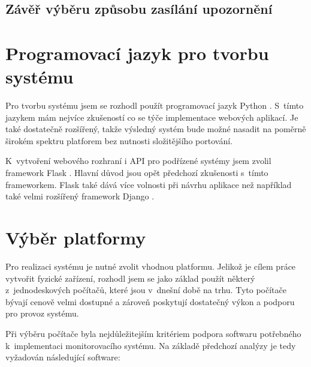 

\subsection{Závěř výběru způsobu zasílání upozornění}




\section{Programovací jazyk pro tvorbu systému}
\label{sec:an_lang}

Pro tvorbu systému jsem se rozhodl použít programovací jazyk Python \cite{python_tutorial}. S~tímto jazykem mám nejvíce zkušeností co se týče implementace webových aplikací. Je také dostatečně rozšířený, takže výsledný systém bude možné nasadit na poměrně širokém spektru platforem bez nutnosti složitějšího portování.

K~vytvoření webového rozhraní i API pro podřízené systémy jsem zvolil framework Flask \cite{flask_about}. Hlavní důvod jsou opět předchozí zkušenosti s~tímto frameworkem. Flask také dává více volnosti při návrhu aplikace než například také velmi rozšířený framework Django \cite{django_about}.

\section{Výběr platformy}
\label{sec:an_plat}

Pro realizaci systému je nutné zvolit vhodnou platformu. Jelikož je cílem práce vytvořit fyzické zařízení, rozhodl jsem se jako základ použít některý z~jednodeskových počítačů, které jsou v~dnešní době na trhu. Tyto počítače bývají cenově velmi dostupné a zároveň poskytují dostatečný výkon a podporu pro provoz systému.

Při výběru počítače byla nejdůležitejším kritériem podpora softwaru potřebného k~implementaci monitorovacího systému. Na základě předchozí analýzy je tedy vyžadován následující software:

